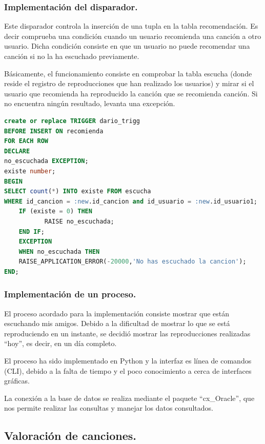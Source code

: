 \documentclass[12pt,a4paper]{article}
\begin{document}
\subsubsection{Implementación del disparador.}
	Este disparador controla la inserción de una tupla en la tabla recomendación. Es decir comprueba una condición cuando un usuario recomienda una canción a otro usuario. Dicha condición consiste en que un usuario no puede recomendar una canción si no la ha escuchado previamente.
	
	Básicamente, el funcionamiento consiste en comprobar la tabla escucha (donde reside el registro de reproducciones que han realizado los usuarios) y mirar si el usuario que recomienda ha reproducido la canción que se recomienda canción. Si no encuentra ningún resultado, levanta una excepción.

\begin{lstlisting}[language=SQL]
create or replace TRIGGER dario_trigg
BEFORE INSERT ON recomienda
FOR EACH ROW
DECLARE
no_escuchada EXCEPTION;
existe number;
BEGIN
SELECT count(*) INTO existe FROM escucha 
WHERE id_cancion = :new.id_cancion and id_usuario = :new.id_usuario1;
    IF (existe = 0) THEN
           RAISE no_escuchada;
    END IF;
    EXCEPTION
    WHEN no_escuchada THEN
    RAISE_APPLICATION_ERROR(-20000,'No has escuchado la cancion');
END;
\end{lstlisting}
\newpage
\subsubsection{Implementación de un proceso.}
	El proceso acordado para la implementación consiste mostrar que están escuchando mis amigos. Debido a la dificultad de mostrar lo que se está reproduciendo en un instante, se decidió mostrar las reproducciones realizadas ``hoy'', es decir, en un día completo.
	
	El proceso ha sido implementado en Python y la interfaz es línea de comandos (CLI), debido a la falta de tiempo y el poco conocimiento a cerca de interfaces gráficas. 
	
	La conexión a la base de datos se realiza mediante el paquete ``cx\_Oracle'', que nos permite realizar las consultas y manejar los datos consultados.





\subsection{Valoración de canciones.}
\end{document}
